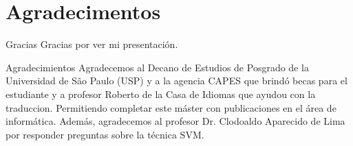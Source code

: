 \section{Agradecimentos}

\begin{frame}
	\begin{block}{Gracias}
		Gracias por ver mi presentación.
	\end{block}
\end{frame}

\begin{frame}
	\begin{block}{Agradecimientos}
		Agradecemos al Decano de Estudios de Posgrado de la Universidad de São Paulo (USP) y a la agencia CAPES que brindó becas para el estudiante y a profesor Roberto de la Casa de Idiomas que ayudou con la traduccion. Permitiendo completar este máster con publicaciones en el área de informática. Además, agradecemos al profesor Dr. Clodoaldo Aparecido de Lima por responder preguntas sobre la técnica SVM.
	\end{block}
\end{frame}
